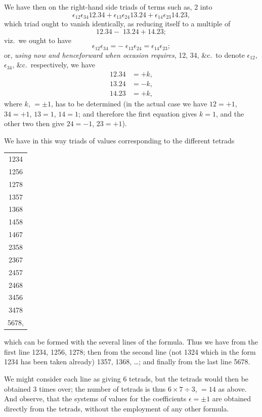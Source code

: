 \documentclass[11pt,a4paper,english]{article}
\theoremstyle{plain}
\begin{document}
We have then on the right-hand side triads of terms such as, 2 into
\[
\epsilon_{12}\epsilon_{34}12.34 + \epsilon_{13}\epsilon_{24}13.24 + \epsilon_{14}\epsilon_{23}14.23,
\]
which triad ought to vanish identically, as reducing itself to a multiple of
\[
12.34 - \; 13.24 + 14.23;
\]
viz.\ we ought to have
\[
\epsilon_{12}\epsilon_{34} = - \; \epsilon_{13}\epsilon_{24} = \epsilon_{14}\epsilon_{23};
\]
or, \textit{using now and henceforward when occasion requires}, 12, 34, \&c.\ to denote $\epsilon_{12}$, $\epsilon_{34}$, \&c.\ respectively, we have
\begin{align*}
12.34 &= +k, \\
13.24 &= -k, \\
14.23 &= +k,
\end{align*}
where $k$, $= \pm 1$, has to be determined (in the actual case we have $12 = +1$, $34 = +1$, $13 = 1$, $14 = 1$; and therefore the first equation gives $k = 1$, and the other two then give $24 = -1$, $23 = +1$).

We have in this way triads of values corresponding to the different tetrads
\begin{center}
\begin{tabular}{c}
1234 \\
1256 \\
1278 \\
1357 \\
1368 \\
1458 \\
1467 \\
2358 \\
2367 \\
2457 \\
2468 \\
3456 \\
3478 \\
5678,
\end{tabular}
\end{center}
which can be formed with the several lines of the formula. Thus we have from the first line 1234, 1256, 1278; then from the second line (not 1324 which in the form 1234 has been taken already) 1357, 1368, \ldots; and finally from the last line 5678.

\newpage
We might consider each line as giving 6 tetrads, but the tetrads would then be obtained 3 times over; the number of tetrads is thus $6 \times 7 \div 3$, $= 14$ as above. And observe, that the systems of values for the coefficients $\epsilon = \pm 1$ are obtained directly from the tetrads, without the employment of any other formula.
\end{document}

